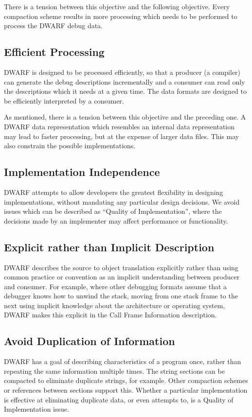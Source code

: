There is a tension between this objective and the following objective. Every compaction scheme results in more processing which needs to be performed to process the DWARF debug data. 

\subsection{Efficient Processing} 
DWARF is designed to be processed efficiently, so that a producer (a compiler) can generate the debug descriptions incrementally and a consumer can read only the descriptions which it needs at a given time. The data formats are designed to be efficiently interpreted by a consumer.

As mentioned, there is a tension between this objective and the preceding one.  A DWARF data representation which resembles an internal data representation may lead to faster processing, but at the expense of larger data files. This may also constrain the possible implementations.

\subsection{Implementation Independence}
DWARF attempts to allow developers the greatest flexibility in designing implementations, without mandating any particular design decisions.  We avoid issues which can be described as “Quality of Implementation”, where the decisions made by an implementer may affect performance or functionality.  

\subsection{Explicit rather than Implicit Description}
DWARF describes the source to object translation explicitly rather than using common practice or convention as an implicit understanding between producer and consumer.  For example, where other debugging formats assume that a debugger knows how to unwind the stack, moving from one stack frame to the next using implicit knowledge about the architecture or operating system, DWARF makes this explicit in the Call Frame Information description.

\subsection{Avoid Duplication of Information}
DWARF has a goal of describing characteristics of a program once, rather than repeating the same information multiple times.  The string sections can be compacted to eliminate duplicate strings, for example.  Other compaction schemes or references between sections support this.
Whether a particular implementation is effective at eliminating duplicate data, or even attempts to, is a Quality of Implementation issue.  

